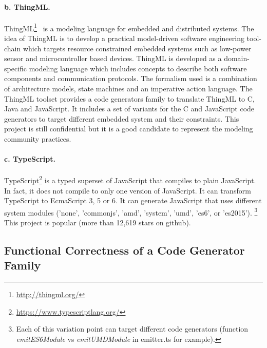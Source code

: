 \paragraph{b. ThingML.} ThingML\footnote{\url{http://thingml.org/}}~\cite{fleurey2011mde} is a modeling language for embedded and distributed systems. The idea of ThingML is to develop a practical model-driven software engineering tool-chain which targets resource constrained embedded systems such as low-power sensor and microcontroller based devices. ThingML is developed as a domain-specific modeling language which includes concepts to describe both software components and communication protocols. The formalism used is a combination of architecture models, state machines and an imperative action language. The ThingML toolset provides a  code generators family  to translate ThingML to C, Java and JavaScript. It includes a set of variants for the C and JavaScript code generators to target different embedded system and their constraints. 
This project is still confidential but it is a good candidate to represent the modeling community practices.
 
\paragraph{c. TypeScript.} TypeScript\footnote{\url{https://www.typescriptlang.org/}}\cite{rastogi2015safe} is a typed superset of JavaScript that compiles to plain JavaScript. In fact, it does not compile to only one version of JavaScript. It can transform TypeScript to EcmaScript 3, 5 or 6. It can generate JavaScript that uses different system modules ('none', 'commonjs', 'amd', 'system', 'umd', 'es6', or 'es2015'). \footnote{Each of this variation point can target different code generators (function \textit{emitES6Module} vs \textit{emitUMDModule} in emitter.ts for example).} This project is popular (more than 12,619 stars on github).


\subsection{Functional Correctness of a Code Generator Family}


